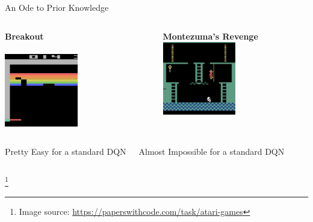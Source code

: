 \documentclass[aspectratio=169]{../latex_main/tntbeamer}  %
\begin{document}
\begin{frame}{An Ode to Prior Knowledge}

    \begin{columns}
        \begin{center}
        \textbf{Breakout}\\ \\
        \includegraphics[width=0.5\textwidth]{images/t01/breakout.jpg}\\
        
        \end{center}
        
        \begin{center}
        \textbf{Montezuma's Revenge} \\
        \includegraphics[width=0.5\textwidth]{images/t01/montezuma.jpg}\\

    \end{center}
    
    \end{columns}
        
        
    \pause

    \begin{columns}
        \centering
        Pretty Easy for a standard DQN

        \centering
        Almost Impossible for a standard DQN
    \end{columns}
    
    \footnote{Image source: \url{https://paperswithcode.com/task/atari-games}}

\end{frame}
\end{document}
